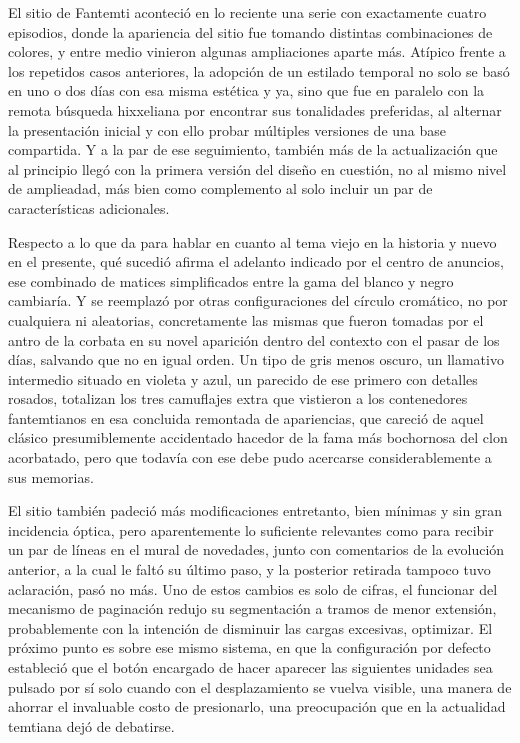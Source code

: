\documentclass[
]{book}
\begin{document}
El sitio de Fantemti aconteció en lo reciente una serie con exactamente cuatro episodios, donde la apariencia del sitio fue tomando distintas combinaciones de colores, y entre medio vinieron algunas ampliaciones aparte más. Atípico frente a los repetidos casos anteriores, la adopción de un estilado temporal no solo se basó en uno o dos días con esa misma estética y ya, sino que fue en paralelo con la remota búsqueda hixxeliana por encontrar sus tonalidades preferidas, al alternar la presentación inicial y con ello probar múltiples versiones de una base compartida. Y a la par de ese seguimiento, también más de la actualización que al principio llegó con la primera versión del diseño en cuestión, no al mismo nivel de amplieadad, más bien como complemento al solo incluir un par de características adicionales.

Respecto a lo que da para hablar en cuanto al tema viejo en la historia y nuevo en el presente, qué sucedió afirma el adelanto indicado por el centro de anuncios, ese combinado de matices simplificados entre la gama del blanco y negro cambiaría. Y se reemplazó por otras configuraciones del círculo cromático, no por cualquiera ni aleatorias, concretamente las mismas que fueron tomadas por el antro de la corbata en su novel aparición dentro del contexto con el pasar de los días, salvando que no en igual orden. Un tipo de gris menos oscuro, un llamativo intermedio situado en violeta y azul, un parecido de ese primero con detalles rosados, totalizan los tres camuflajes extra que vistieron a los contenedores fantemtianos en esa concluida remontada de apariencias, que careció de aquel clásico presumiblemente accidentado hacedor de la fama más bochornosa del clon acorbatado, pero que todavía con ese debe pudo acercarse considerablemente a sus memorias.

El sitio también padeció más modificaciones entretanto, bien mínimas y sin gran incidencia óptica, pero aparentemente lo suficiente relevantes como para recibir un par de líneas en el mural de novedades, junto con comentarios de la evolución anterior, a la cual le faltó su último paso, y la posterior retirada tampoco tuvo aclaración, pasó no más. Uno de estos cambios es solo de cifras, el funcionar del mecanismo de paginación redujo su segmentación a tramos de menor extensión, probablemente con la intención de disminuir las cargas excesivas, optimizar. El próximo punto es sobre ese mismo sistema, en que la configuración por defecto estableció que el botón encargado de hacer aparecer las siguientes unidades sea pulsado por sí solo cuando con el desplazamiento se vuelva visible, una manera de ahorrar el invaluable costo de presionarlo, una preocupación que en la actualidad temtiana dejó de debatirse.
\end{document}
